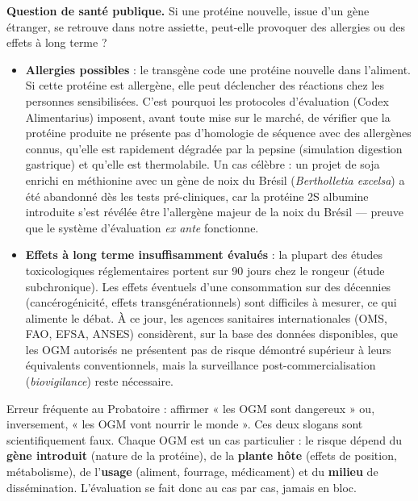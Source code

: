 \documentclass[11pt]{article}
\newcommand{\cle}[1]{{\popxbold\color{popdark}#1}}
\begin{document}
\textbf{Question de santé publique.} Si une protéine nouvelle, issue d'un gène étranger, se retrouve dans notre assiette, peut-elle provoquer des allergies ou des effets à long terme ?

\begin{itemize}
\item \textbf{Allergies possibles} : le transgène code une protéine nouvelle dans l'aliment. Si cette protéine est \cle{allergène}, elle peut déclencher des réactions chez les personnes sensibilisées. C'est pourquoi les protocoles d'évaluation (Codex Alimentarius) imposent, avant toute mise sur le marché, de vérifier que la protéine produite ne présente pas d'homologie de séquence avec des allergènes connus, qu'elle est rapidement dégradée par la pepsine (simulation digestion gastrique) et qu'elle est thermolabile. Un cas célèbre : un projet de soja enrichi en méthionine avec un gène de noix du Brésil (\emph{Bertholletia excelsa}) a été abandonné dès les tests pré-cliniques, car la protéine 2S albumine introduite s'est révélée être l'allergène majeur de la noix du Brésil — preuve que le système d'évaluation \emph{ex ante} fonctionne.
\item \textbf{Effets à long terme insuffisamment évalués} : la plupart des études toxicologiques réglementaires portent sur 90 jours chez le rongeur (étude subchronique). Les effets éventuels d'une consommation sur des décennies (cancérogénicité, effets transgénérationnels) sont difficiles à mesurer, ce qui alimente le débat. À ce jour, les agences sanitaires internationales (OMS, FAO, EFSA, ANSES) considèrent, sur la base des données disponibles, que les OGM autorisés ne présentent pas de risque démontré supérieur à leurs équivalents conventionnels, mais la surveillance post-commercialisation (\emph{biovigilance}) reste nécessaire.
\end{itemize}

\begin{attention}
Erreur fréquente au Probatoire : affirmer « les OGM sont dangereux » ou, inversement, « les OGM vont nourrir le monde ». Ces deux slogans sont scientifiquement faux. Chaque OGM est un cas particulier : le risque dépend du \textbf{gène introduit} (nature de la protéine), de la \textbf{plante hôte} (effets de position, métabolisme), de l'\textbf{usage} (aliment, fourrage, médicament) et du \textbf{milieu} de dissémination. L'évaluation se fait donc \cle{au cas par cas}, jamais en bloc.
\end{attention}
\end{document}
